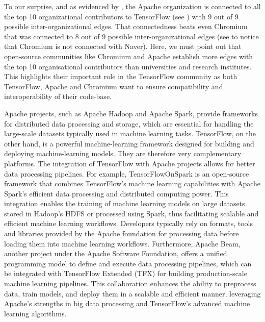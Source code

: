 \documentclass[CHICAGO,Times1COL]{WileyNJDv5} %
\begin{document}
To our surprise, and as evidenced by , the Apache organization is connected to all the top 10 organizational contributors to TensorFlow (see ) with 9 out of 9 possible inter-organizational edges. That connectedness beats even Chromium that was connected to 8 out of 9  possible inter-organizational edges (see  to notice that Chromium is not connected with Naver). Here, we must point out that open-source communities like Chromium and Apache establish more edges with the top 10 organisational contributors than universities and research institutes. This highlights their important role in the TensorFlow community as both TensorFlow, Apache and Chromium want to ensure compatibility and interoperability of their code-base. 


Apache projects, such as Apache Hadoop and Apache Spark, provide frameworks for distributed data processing and storage, which are essential for handling the large-scale datasets typically used in machine learning tasks. TensorFlow, on the other hand, is a powerful machine-learning framework designed for building and deploying machine-learning models. They are therefore very complementary platforms.  The integration of TensorFlow with Apache projects allows for better data processing pipelines. 
For example, TensorFlowOnSpark is an open-source framework that combines TensorFlow's machine learning capabilities with Apache Spark's efficient data processing and distributed computing power. This integration enables the training of machine learning models on large datasets stored in Hadoop's HDFS or processed using Spark, thus facilitating scalable and efficient machine learning workflows. Developers typically rely on formats, tools and libraries provided by the Apache foundation for processing data before loading them into machine learning workflows.  Furthermore, Apache Beam, another project under the Apache Software Foundation, offers a unified programming model to define and execute data processing pipelines, which can be integrated with TensorFlow Extended (TFX) for building production-scale machine learning pipelines. This collaboration enhances the ability to preprocess data, train models, and deploy them in a scalable and efficient manner, leveraging Apache's strengths in big data processing and TensorFlow's advanced machine learning algorithms. 
\end{document}

